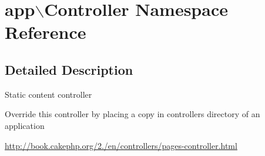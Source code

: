 \hypertarget{namespaceapp_1_1Controller}{
\section{app$\backslash$\-Controller \-Namespace \-Reference}
\label{namespaceapp_1_1Controller}
}


\subsection{\-Detailed \-Description}
\-Static content controller

\-Override this controller by placing a copy in controllers directory of an application

\hyperlink{}{http\-://book.\-cakephp.\-org/2./en/controllers/pages-\/controller.\-html}